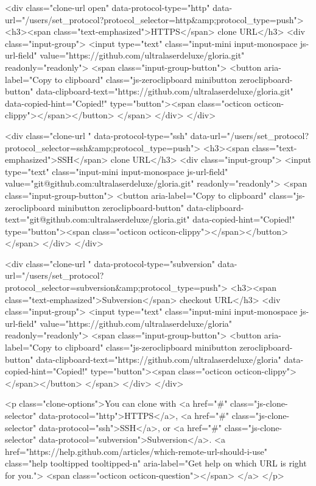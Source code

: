   
<div class="clone-url open"
  data-protocol-type="http"
  data-url="/users/set_protocol?protocol_selector=http&amp;protocol_type=push">
  <h3><span class="text-emphasized">HTTPS</span> clone URL</h3>
  <div class="input-group">
    <input type="text" class="input-mini input-monospace js-url-field"
           value="https://github.com/ultralaserdeluxe/gloria.git" readonly="readonly">
    <span class="input-group-button">
      <button aria-label="Copy to clipboard" class="js-zeroclipboard minibutton zeroclipboard-button" data-clipboard-text="https://github.com/ultralaserdeluxe/gloria.git" data-copied-hint="Copied!" type="button"><span class="octicon octicon-clippy"></span></button>
    </span>
  </div>
</div>

  
<div class="clone-url "
  data-protocol-type="ssh"
  data-url="/users/set_protocol?protocol_selector=ssh&amp;protocol_type=push">
  <h3><span class="text-emphasized">SSH</span> clone URL</h3>
  <div class="input-group">
    <input type="text" class="input-mini input-monospace js-url-field"
           value="git@github.com:ultralaserdeluxe/gloria.git" readonly="readonly">
    <span class="input-group-button">
      <button aria-label="Copy to clipboard" class="js-zeroclipboard minibutton zeroclipboard-button" data-clipboard-text="git@github.com:ultralaserdeluxe/gloria.git" data-copied-hint="Copied!" type="button"><span class="octicon octicon-clippy"></span></button>
    </span>
  </div>
</div>

  
<div class="clone-url "
  data-protocol-type="subversion"
  data-url="/users/set_protocol?protocol_selector=subversion&amp;protocol_type=push">
  <h3><span class="text-emphasized">Subversion</span> checkout URL</h3>
  <div class="input-group">
    <input type="text" class="input-mini input-monospace js-url-field"
           value="https://github.com/ultralaserdeluxe/gloria" readonly="readonly">
    <span class="input-group-button">
      <button aria-label="Copy to clipboard" class="js-zeroclipboard minibutton zeroclipboard-button" data-clipboard-text="https://github.com/ultralaserdeluxe/gloria" data-copied-hint="Copied!" type="button"><span class="octicon octicon-clippy"></span></button>
    </span>
  </div>
</div>


<p class="clone-options">You can clone with
      <a href="#" class="js-clone-selector" data-protocol="http">HTTPS</a>,
      <a href="#" class="js-clone-selector" data-protocol="ssh">SSH</a>,
      or <a href="#" class="js-clone-selector" data-protocol="subversion">Subversion</a>.
  <a href="https://help.github.com/articles/which-remote-url-should-i-use" class="help tooltipped tooltipped-n" aria-label="Get help on which URL is right for you.">
    <span class="octicon octicon-question"></span>
  </a>
</p>



